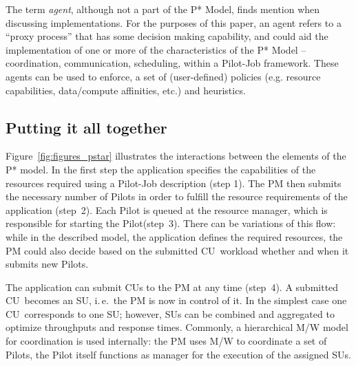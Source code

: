 \documentclass[conference,final]{IEEEtran}
\newcommand{\jhanote}[1]{ {\textcolor{red} { ***shantenu: #1 }}}
\newcommand{\jhanote}[1]{}
\newcommand{\pilot}{Pilot\xspace}
\newcommand{\pilots}{Pilots\xspace}
\newcommand{\pilotjob}{Pilot-Job\xspace}
\newcommand{\cu}{CU\xspace}
\newcommand{\cus}{CUs\xspace}
\begin{document}
The term {\it agent}, although not a part of the P* Model, finds
mention when discussing implementations. For the purposes of this
paper, an agent refers to a ``proxy process'' 
that has some decision making capability, and could aid the
implementation of one or more of the characteristics of the P* Model
-- coordination, communication, scheduling, within a \pilotjob
framework.  These agents can be used to enforce, a set of
(user-defined) policies (e.g.  resource capabilities, data/compute
affinities, etc.) and heuristics.

\subsection{Putting it all together} 
Figure~\ref{fig:figures_pstar}
illustrates the interactions between the elements of the P* model. In
the first step the application specifies the capabilities of the
resources required using a \pilotjob description (step 1). The PM then
submits the necessary number of \pilots in order to fulfill the
resource requirements of the application (step~2). Each \pilot is
queued at the resource manager, which is responsible for starting the
\pilot (step~3). There can be variations of this flow: while in the
described model, the application defines the required resources, the
PM could also decide based on the submitted \cu \ workload whether and
when it submits new \pilots.


The application can submit \cus to the PM at any time (step~4). A
submitted \cu \ becomes an SU, i.\,e.\ the PM is now in control of
it. In the simplest case one \cu \ corresponds to one SU; however,
SUs can be combined and aggregated to optimize throughputs and
response times. Commonly, a hierarchical M/W model for coordination
is used internally: the PM uses M/W to coordinate a set of \pilots,
the \pilot itself functions as manager for the execution of the
assigned SUs.
\end{document}

